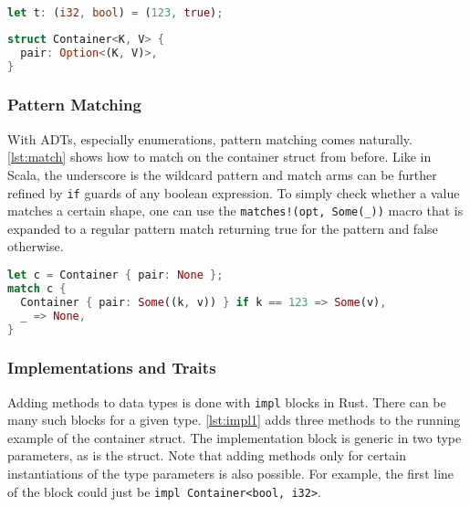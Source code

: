 \noindent\begin{minipage}[t]{.45\textwidth}
\begin{lstlisting}[language=Rust, style=short, caption={A two-tuple in Rust.}, label=lst:tuples]
let t: (i32, bool) = (123, true);
\end{lstlisting}
\end{minipage}\hfill
\begin{minipage}[t]{.45\textwidth}
\begin{lstlisting}[language=Rust, style=short, label={lst:container}, caption={The struct for the running example.}]
struct Container<K, V> {
  pair: Option<(K, V)>,
}
\end{lstlisting}
\end{minipage}

\subsubsection{Pattern Matching}

With ADTs, especially enumerations, pattern matching comes naturally.
\autoref{lst:match} shows how to match on the container struct from before. Like
in Scala, the underscore is the wildcard pattern and match arms can be further
refined by \lstinline!if! guards of any boolean expression. To simply check
whether a value matches a certain shape, one can use the
\lstinline"matches!(opt, Some(_))" macro that is expanded to a regular pattern
match returning true for the pattern and false otherwise.

\begin{lstlisting}[language=Rust, caption={Pattern matching on a struct.}, label=lst:match]
let c = Container { pair: None };
match c {
  Container { pair: Some((k, v)) } if k == 123 => Some(v),
  _ => None,
}
\end{lstlisting}

\subsubsection{Implementations and Traits}

Adding methods to data types is done with \lstinline!impl! blocks in Rust. There
can be many such blocks for a given type. \autoref{lst:impl1} adds three methods
to the running example of the container struct. The implementation block is
generic in two type parameters, as is the struct. Note that adding methods only
for certain instantiations of the  type parameters is also possible. For
example, the first line of the block could just be \passthrough{\lstinline!impl
Container<bool, i32>!}.

